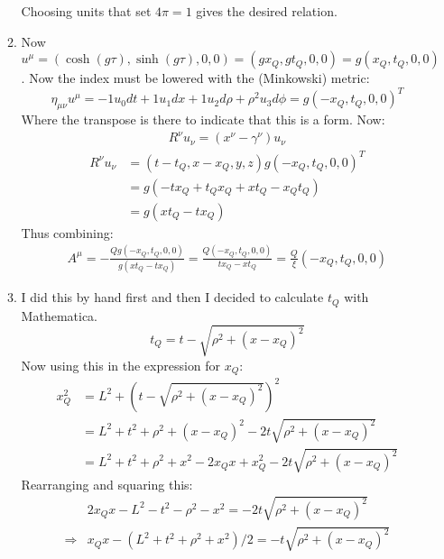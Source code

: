 \documentclass[12pt,a4]{article}
\begin{document}
\begin{enumerate}
\begin{enumerate}
        Choosing units that set $4 \pi = 1$ gives the desired relation.
      \item
        Now $u^\mu = (\cosh(g \tau), \sinh(g \tau), 0, 0) = (g x_Q, g t_Q, 0, 0) = g(x_Q,t_Q, 0, 0)$. 
        Now the index must be lowered with the (Minkowski) metric:
        \begin{equation*}
          \eta_{\mu\nu} u^\mu = -1 u_0 dt + 1 u_1 dx + 1 u_2 d\rho + \rho^2 u_3 d\phi = g(-x_Q,t_Q, 0, 0)^{T}
        \end{equation*}
        Where the transpose is there to indicate that this is a form.
        Now:
        \begin{align*}
          R^\nu u_\nu = (x^\nu - \gamma^\nu)u_\nu
        \end{align*}
        \begin{align*}
          R^\nu u_\nu &= (t - t_Q, x - x_Q, y, z) g (-x_Q, t_Q, 0, 0)^T\\
                      &= g(-t x_Q + t_Qx_Q +x t_Q - x_Qt_Q)\\
                      &= g(x t_Q -t x_Q)
        \end{align*}
        Thus combining:
        \begin{align*}
          A^\mu = - \frac{Q g (-x_Q, t_Q, 0, 0)}{g(x t_Q -t x_Q)} = \frac{Q  (-x_Q, t_Q, 0, 0)}{t x_Q - x t_Q} = \frac{Q}{\xi} (-x_Q, t_Q, 0, 0)
        \end{align*}
      \item
        I did this by hand first and then I decided to calculate $t_Q$ with Mathematica.
        \begin{equation*}
          t_Q = t - \sqrt{\rho^2 + (x - x_Q)^2}
        \end{equation*}
        Now using this in the expression for $x_Q$:
        \begin{align*}
          x_Q^2 &= L^2 + \left(t - \sqrt{\rho^2 + (x - x_Q)^2}\right)^2\\
                &= L^2 + t^2 + \rho^2 + (x - x_Q)^2 - 2 t \sqrt{\rho^2 + (x - x_Q)^2}\\
                &= L^2 + t^2 + \rho^2 + x^2 - 2x_Qx + x_Q^2 - 2 t \sqrt{\rho^2 + (x - x_Q)^2}
        \end{align*}
        Rearranging and squaring this:
        \begin{align*}
                      & 2x_Qx - L^2 - t^2 - \rho^2 - x^2 = -2 t \sqrt{\rho^2 + (x - x_Q)^2}\\
          \Rightarrow & x_Qx - (L^2 + t^2 + \rho^2 + x^2)/2 = - t \sqrt{\rho^2 + (x - x_Q)^2}\\

\end{align*}
\end{enumerate}
\end{enumerate}
\end{document}

